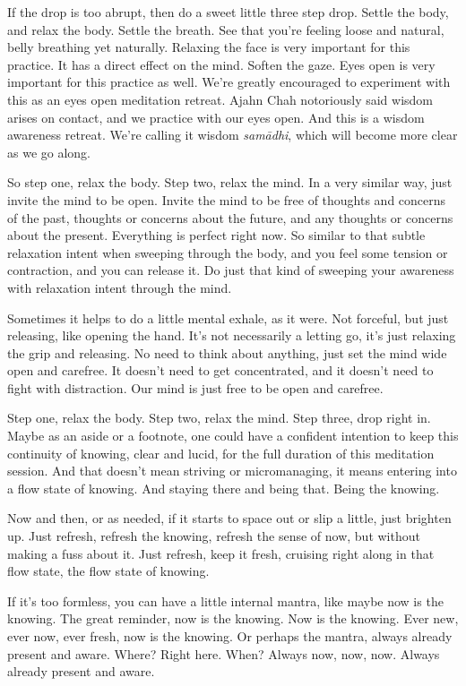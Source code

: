 \documentclass[12pt,openany]{book}
\begin{document}
If the drop is too abrupt, then do a sweet little three step drop. Settle the body, and relax the body. Settle the breath. See that you're feeling loose and natural, belly breathing yet  naturally. Relaxing the face is very important for this practice. It has a direct effect on the mind. Soften the gaze. Eyes open is very important for this practice as well. We're greatly encouraged to experiment with this as an eyes open meditation retreat. Ajahn Chah notoriously said wisdom arises on contact, and we practice with our eyes open. And this is a wisdom awareness retreat. We’re calling it wisdom \textit{samādhi}, which will become more clear as we go along.

So step one, relax the body. Step two, relax the mind. In a very similar way, just invite the mind  to be open. Invite the mind to be free of thoughts and concerns of the past, thoughts or concerns about the future, and any thoughts or concerns about the present. Everything is perfect right now. So similar to that subtle relaxation intent when sweeping through the body, and you feel some tension or contraction, and you can release it. Do just that kind of sweeping your awareness with relaxation intent through the mind. 

Sometimes it helps to do a little mental exhale, as it were. Not forceful, but just releasing, like opening the hand. It's not necessarily a letting go, it’s just relaxing the grip and releasing. No need to think about anything, just set the mind wide open and carefree. It doesn’t need to get concentrated, and it doesn’t need to fight with distraction. Our mind is just free to be open and carefree. 

Step one, relax the body. Step two, relax the mind. Step three, drop right in. Maybe as an aside or a footnote, one could have a confident intention to keep this continuity of knowing, clear and lucid, for the full duration of this meditation session. And that doesn't mean striving or micromanaging, it means entering into a flow state of knowing. And staying there and being that. Being the knowing.

Now and then, or as needed, if it starts to space out or slip a little, just brighten up. Just refresh, refresh the knowing, refresh the sense of now, but without making a fuss about it. Just refresh, keep it fresh, cruising right along in that flow state, the flow state of knowing.

If it's too formless, you can have a little internal mantra, like \linebreak maybe now is the knowing. The great reminder, now is the knowing. Now is the knowing. Ever new, ever now, ever fresh, now is the knowing. Or perhaps the mantra, always already present and aware. Where? Right here. When? Always now, now, now. Always already present and aware.
\end{document}
